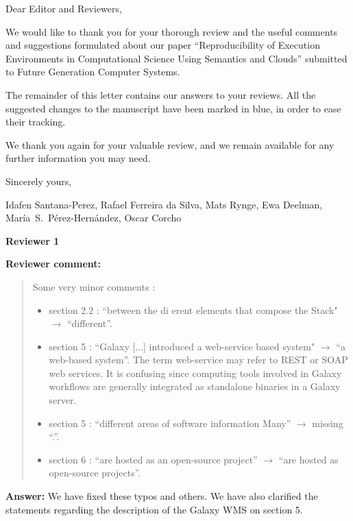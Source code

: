 \documentclass{letter}
\date{Nov XX, 2015}
\newenvironment{review}%
{\textbf{Reviewer comment:}\begin{quote}}%
{\end{quote}}%
\newcommand{\answer}[1]{%
      \textbf{Answer:} #1}
\begin{document}
\begin{letter}{}

\opening{Dear Editor and Reviewers,}

We would like to thank you for your thorough review and the useful
comments and suggestions formulated about our paper 
``Reproducibility of Execution Environments in Computational Science Using Semantics and Clouds'' 
submitted to Future Generation Computer Systems.

The remainder of this letter contains our answers to your reviews. All the suggested changes to the manuscript have been marked in blue, in order to ease their tracking.

We thank you again for your valuable review, and we remain available for any further information you may need.

\vspace{0.5cm}

Sincerely yours,

\vspace{1cm}

Idafen Santana-Perez, Rafael Ferreira da Silva, Mats Rynge, Ewa Deelman, Mar\'ia~S.~P\'erez-Hern\'andez, Oscar Corcho

\newpage


%
%
\textbf{Reviewer 1}

\begin{review}
Some very minor comments :
\begin{itemize}
        \item section 2.2 : ``between the di  erent elements that compose the Stack" $\rightarrow$ ``different''.
        \item section 5 : ``Galaxy [...] introduced a web-service based system" $\rightarrow$ ``a web-based system''. The term web-service may refer to REST or SOAP web services. It is confusing since computing tools involved in Galaxy workflows are generally integrated as standalone binaries in a Galaxy server.
        \item section 5 : ``different areas of software information Many'' $\rightarrow$ missing ``.''.
        \item section 6 : ``are hosted as an open-source project'' $\rightarrow$ ``are hosted as open-source projects''.
        \end{itemize}
\end{review}

\answer{We have fixed these typos and others. We have also clarified the statements regarding the description of the Galaxy WMS on section 5.}


\end{letter}
\end{document}
